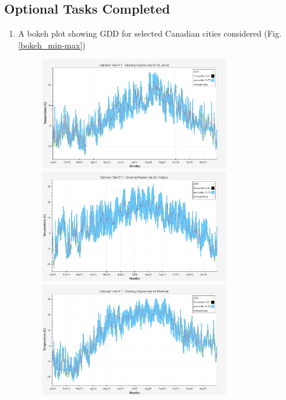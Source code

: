 \documentclass{article}
\begin{document}
\subsection{ \bf Optional Tasks Completed}
\begin{enumerate}
\item A bokeh plot showing GDD for selected Canadian cities considered (Fig. \ref{bokeh_min-max})
\begin{center}
\begin{figure}[!h] 
\includegraphics[width=3.25in]{./source/Report/Op1_St_Johns.png}\\

\includegraphics[width=3.25in]{./source/Report/Op1_Calgary.png}\\

\includegraphics[width=3.25in]{./source/Report/Op1_Montreal.png}\\


\end{figure}
\end{center}
\end{enumerate}
\end{document}
